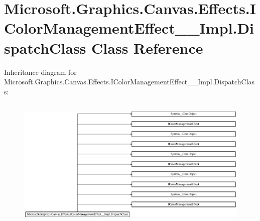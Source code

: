 \hypertarget{class_microsoft_1_1_graphics_1_1_canvas_1_1_effects_1_1_i_color_management_effect_____impl_1_1_dispatch_class}{}\section{Microsoft.\+Graphics.\+Canvas.\+Effects.\+I\+Color\+Management\+Effect\+\_\+\+\_\+\+Impl.\+Dispatch\+Class Class Reference}
\label{class_microsoft_1_1_graphics_1_1_canvas_1_1_effects_1_1_i_color_management_effect_____impl_1_1_dispatch_class}
Inheritance diagram for Microsoft.\+Graphics.\+Canvas.\+Effects.\+I\+Color\+Management\+Effect\+\_\+\+\_\+\+Impl.\+Dispatch\+Class\+:\begin{figure}[H]
\begin{center}
\leavevmode
\includegraphics[height=6.403327cm]{class_microsoft_1_1_graphics_1_1_canvas_1_1_effects_1_1_i_color_management_effect_____impl_1_1_dispatch_class}
\end{center}
\end{figure}
